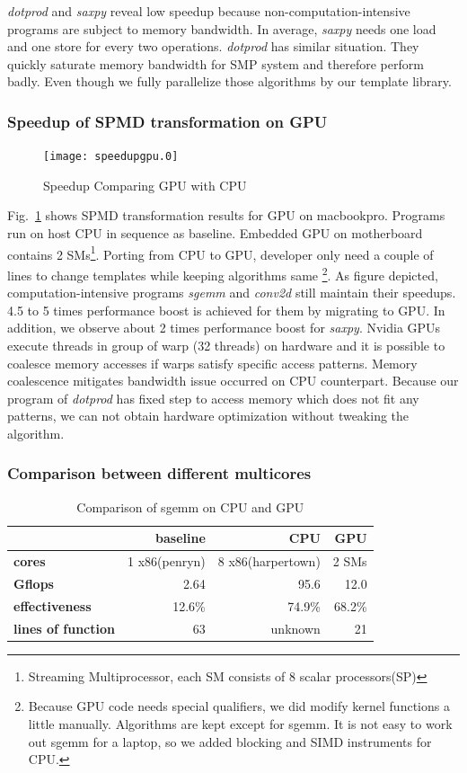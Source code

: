 \documentclass[10pt, conference, compsocconf]{IEEEtran}
\begin{document}
\textit{dotprod} and \textit{saxpy} reveal low speedup because non-computation-intensive
programs are subject to memory bandwidth.  In average, \textit{saxpy} needs one load and one 
store for every two operations. \textit{dotprod} has similar
situation. They quickly saturate memory bandwidth for SMP system and
therefore perform badly. Even though we fully parallelize those
algorithms by our template library. 
\subsubsection{Speedup of SPMD transformation on GPU}
\begin{figure}
\texttt{[image: speedupgpu.0]}
\caption{Speedup Comparing GPU with CPU}\label{fig:spdgpu}
\end{figure}

Fig.~\ref{fig:spdgpu} shows SPMD transformation results for GPU on
macbookpro. Programs run on host CPU  in sequence as
baseline. Embedded GPU on motherboard contains 2
SMs\footnote{Streaming Multiprocessor, each SM consists of 8 scalar processors(SP)}.
Porting from CPU to GPU, developer only need a couple of lines to change
templates while keeping algorithms same \footnote{
Because GPU code needs special qualifiers, we did modify kernel
functions a little manually.  Algorithms are kept except for sgemm. It is not easy
 to work out sgemm for a laptop, so we added blocking and SIMD
 instruments for CPU.}. As figure depicted,  computation-intensive programs
\textit{sgemm} and \textit{conv2d} still maintain their speedups. 4.5 to 5 times
performance boost is achieved for them by migrating to GPU.
In addition, we observe about 2 times performance boost for
\textit{saxpy}. Nvidia GPUs execute
threads in group of warp (32 threads) on hardware and it is
possible to coalesce memory accesses if warps satisfy
specific access patterns. Memory coalescence mitigates bandwidth issue
occurred on CPU counterpart. Because our program of \textit{dotprod} has fixed
step to access memory which does not fit any patterns, we can not
obtain hardware optimization without tweaking the algorithm.

\subsubsection{Comparison between different multicores}
\begin{table}[hbt]
\caption{Comparison of sgemm on CPU and GPU}\label{tbl:sgemm}
\begin{tabular}{|l|r|r|r|}
\hline
& baseline& CPU & GPU\\
\hline
\textbf{cores} &1 x86(penryn)& 8 x86(harpertown)& 2 SMs\\
\hline
\textbf{Gflops}& 2.64 &95.6&  12.0\\
\hline
\textbf{effectiveness}&12.6\%& 74.9\%&68.2\%\\
\hline
\textbf{lines of function}&63&unknown&21\\
\hline
\end{tabular}
\end{table}
\end{document}
